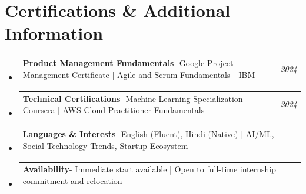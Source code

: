 \documentclass[a4paper,11pt]{article}
\makeatletter
\newcommand{\resumePOR}[3]{
\vspace{0.5mm}\item
    \begin{tabular*}{0.97\textwidth}[t]{l@{\extracolsep{\fill}}r}
        \textbf{#1}\hspace{0.3mm}#2 & \textit{\small{#3}} 
    \end{tabular*}
    \vspace{-2mm}
}
\newcommand{\resumeSubHeadingListStart}{\begin{itemize}[leftmargin=*,labelsep=1mm]}
\newcommand{\resumeSubHeadingListEnd}{\end{itemize}\vspace{2mm}}
\makeatother
\begin{document}
\vspace{-2mm}

\section{\textbf{Certifications \& Additional Information}}
\vspace{-0.2mm}
\resumeSubHeadingListStart
\resumePOR{Product Management Fundamentals}{- Google Project Management Certificate | Agile and Scrum Fundamentals - IBM}{2024}
\resumePOR{Technical Certifications}{- Machine Learning Specialization - Coursera | AWS Cloud Practitioner Fundamentals}{2024}
\resumePOR{Languages \& Interests}{- English (Fluent), Hindi (Native) | AI/ML, Social Technology Trends, Startup Ecosystem}{-}
\resumePOR{Availability}{- Immediate start available | Open to full-time internship commitment and relocation}{-}
\resumeSubHeadingListEnd
\end{document}
